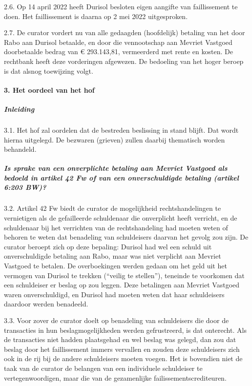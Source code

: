 \documentclass[
  dutch,
  a4paper,
]{article}
\begin{document}
2.6. Op 14 april 2022 heeft Durisol besloten eigen aangifte van faillissement te doen. Het faillissement is daarna op 2 mei 2022 uitgesproken.

2.7. De curator vordert nu van alle gedaagden (hoofdelijk) betaling van het door Rabo aan Durisol betaalde, en door die vennootschap aan Mevriet Vastgoed doorbetaalde bedrag van € 293.143,81, vermeerderd met rente en kosten. De rechtbank heeft deze vorderingen afgewezen. De bedoeling van het hoger beroep is dat alsnog toewijzing volgt.

\paragraph{3. Het oordeel van het hof}\label{het-oordeel-van-het-hof}

\subparagraph{Inleiding}\label{inleiding}

3.1. Het hof zal oordelen dat de bestreden beslissing in stand blijft. Dat wordt hierna uitgelegd. De bezwaren (grieven) zullen daarbij thematisch worden behandeld.

\subparagraph{Is sprake van een onverplichte betaling aan Mevriet Vastgoed als bedoeld in artikel 42 Fw of van een onverschuldigde betaling (artikel 6:203 BW)?}\label{is-sprake-van-een-onverplichte-betaling-aan-mevriet-vastgoed-als-bedoeld-in-artikel-42-fw-of-van-een-onverschuldigde-betaling-artikel-6203-bw}

3.2. Artikel 42 Fw biedt de curator de mogelijkheid rechtshandelingen te vernietigen als de gefailleerde schuldenaar die onverplicht heeft verricht, en de schuldenaar bij het verrichten van de rechtshandeling had moeten weten of behoren te weten dat benadeling van schuldeisers daarvan het gevolg zou zijn. De curator beroept zich op deze bepaling: Durisol had wel een schuld uit onverschuldigde betaling aan Rabo, maar was niet verplicht aan Mevriet Vastgoed te betalen. De overboekingen werden gedaan om het geld uit het vermogen van Durisol te trekken (``veilig te stellen''), teneinde te voorkomen dat een schuldeiser er beslag op zou leggen. Deze betalingen aan Mevriet Vastgoed waren onverschuldigd, en Durisol had moeten weten dat haar schuldeisers daardoor werden benadeeld.

3.3. Voor zover de curator doelt op benadeling van schuldeisers die door de transacties in hun beslagmogelijkheden werden gefrustreerd, is dat onterecht. Als de transacties niet hadden plaatsgehad en wel beslag was gelegd, dan zou dat beslag door het faillissement immers vervallen en zouden deze schuldeisers zich ook in de rij bij de andere schuldeisers moeten voegen. Het is bovendien niet de taak van de curator de belangen van een individuele schuldeiser te vertegenwoordigen, maar die van de gezamenlijke failissementscrediteuren.
\end{document}
